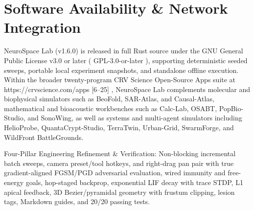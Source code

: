 \documentclass[10pt,letterpaper]{article}
\begin{document}
\section{Software Availability \& Network Integration}
NeuroSpace Lab (v1.6.0) is released in full Rust source under the GNU General Public License v3.0 or later ( GPL-3.0-or-later ), supporting deterministic seeded sweeps, portable local experiment snapshots, and standalone offline execution. Within the broader twenty-program CRV Science Open-Source Apps suite at https://crvscience.com/apps [6--25] , NeuroSpace Lab complements molecular and biophysical simulators such as BeoFold, SAR-Atlas, and Causal-Atlas, mathematical and bioacoustic workbenches such as Calc-Lab, OSABT, PopBio-Studio, and SonoWing, as well as systems and multi-agent simulators including HelioProbe, QuantaCrypt-Studio, TerraTwin, Urban-Grid, SwarmForge, and WildFront BattleGrounds.

Four-Pillar Engineering Refinement \& Verification: Non-blocking incremental batch sweeps, camera preset/tool hotkeys, and right-drag pan pair with true gradient-aligned FGSM/PGD adversarial evaluation, wired immunity and free-energy goals, hop-staged backprop, exponential LIF decay with trace STDP, L1 apical feedback, 3D Bezier/pyramidal geometry with frustum clipping, lesion tags, Markdown guides, and 20/20 passing tests.
\end{document}
